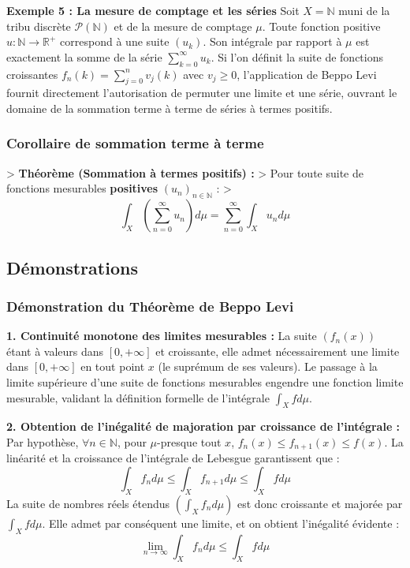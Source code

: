 \documentclass[11pt,a4paper]{article}
\begin{document}
\textbf{Exemple 5 : La mesure de comptage et les séries}
Soit $X = \mathbb{N}$ muni de la tribu discrète $\mathcal{P}(\mathbb{N})$ et de la mesure de comptage $\mu$.
Toute fonction positive $u: \mathbb{N} \to \mathbb{R}^+$ correspond à une suite $(u_k)$. Son intégrale par rapport à $\mu$ est exactement la somme de la série $\sum_{k=0}^\infty u_k$.
Si l'on définit la suite de fonctions croissantes $f_n(k) = \sum_{j=0}^n v_j(k)$ avec $v_j \ge 0$, l'application de Beppo Levi fournit directement l'autorisation de permuter une limite et une série, ouvrant le domaine de la sommation terme à terme de séries à termes positifs.

\subsubsection*{Corollaire de sommation terme à terme}

> \textbf{Théorème (Sommation à termes positifs) :}
> Pour toute suite de fonctions mesurables \textbf{positives} $(u_n)_{n \in \mathbb{N}}$ :
> $$\int_X \left( \sum_{n=0}^\infty u_n \right) d\mu = \sum_{n=0}^\infty \int_X u_n d\mu$$

\subsection*{Démonstrations}

\subsubsection*{Démonstration du Théorème de Beppo Levi}

\textbf{1. Continuité monotone des limites mesurables :}
La suite $(f_n(x))$ étant à valeurs dans $[0, +\infty]$ et croissante, elle admet nécessairement une limite dans $[0, +\infty]$ en tout point $x$ (le suprémum de ses valeurs). Le passage à la limite supérieure d'une suite de fonctions mesurables engendre une fonction limite mesurable, validant la définition formelle de l'intégrale $\int_X f d\mu$.

\textbf{2. Obtention de l'inégalité de majoration par croissance de l'intégrale :}
Par hypothèse, $\forall n \in \mathbb{N}$, pour $\mu$-presque tout $x$, $f_n(x) \le f_{n+1}(x) \le f(x)$.
La linéarité et la croissance de l'intégrale de Lebesgue garantissent que :
$$\int_X f_n d\mu \le \int_X f_{n+1} d\mu \le \int_X f d\mu$$
La suite de nombres réels étendus $\left( \int_X f_n d\mu \right)$ est donc croissante et majorée par $\int_X f d\mu$. Elle admet par conséquent une limite, et on obtient l'inégalité évidente :
$$\lim_{n \to \infty} \int_X f_n d\mu \le \int_X f d\mu$$
\end{document}

